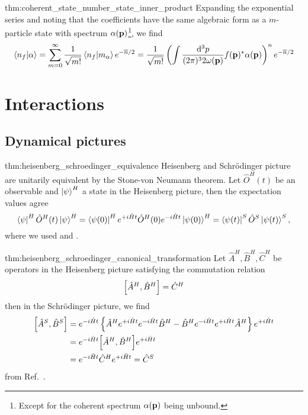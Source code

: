 \begin{delayedproof}{thm:coherent_state_number_state_inner_product}
	Expanding the exponential series and noting that the coefficients have the same algebraic form as a $m$-particle state with spectrum $\alpha(\vb{p})$\footnote{Except for the coherent spectrum $\alpha(\vb{p})$ being unbound.}, we find
	\begin{equation*}
		\braket{n_f}{\alpha}
		=
		\sum_{m=0}^\infty
		\frac{1}{\sqrt{m!}}
		\braket{n_f}{m_\alpha}
		e^{-\overline{n}/2}
		=
		\frac{1}{\sqrt{m!}}
		\left(
			\int\frac{\dd[3]{p}}{(2\pi)^32\omega(\vb{p})}
			f(\vb{p})^*
			\alpha(\vb{p})
		\right)^n
		e^{-\overline{n}/2}
	\end{equation*}
\end{delayedproof}

\section{Interactions}

\subsection{Dynamical pictures}

\begin{delayedproof}{thm:heisenberg_schroedinger_equivalence}
	Heisenberg and Schrödinger picture are unitarily equivalent by the Stone-von Neumann theorem.
	Let $\hat{O}^H(t)$ be an observable and $\ket{\psi}^H$ a state in the Heisenberg picture, then the expectation values agree
	\begin{equation}
		\bra{\psi}^H
		\hat{O}^H(t)
		\ket{\psi}^H
		=
		\bra{\psi(0)}^H
		e^{+i\hat{H}t}
		\hat{O}^H(0)
		e^{-i\hat{H}t}
		\ket{\psi(0)}^H
		=
		\bra{\psi(t)}^S
		\hat{O}^S
		\ket{\psi(t)}^S
		,
	\end{equation}
	where we used  and .
\end{delayedproof}

\begin{delayedproof}{thm:heisenberg_schroedinger_canonical_transformation}
	Let $\hat{A}^H,\hat{B}^H,\hat{C}^H$ be operators in the Heisenberg picture satisfying the commutation relation
	\begin{equation}
		\comm{\hat{A}^H}{\hat{B}^H}
		=
		\hat{C}^H
	\end{equation}
	then in the Schrödinger picture, we find
	\begin{equation}
		\begin{split}
			\comm{\hat{A}^S}{\hat{B}^S}
			&=
			e^{-i\hat{H}t}
			\left\{
				\hat{A}^H
				e^{+i\hat{H}t}
				e^{-i\hat{H}t}
				\hat{B}^H
				-	
				\hat{B}^H
				e^{-i\hat{H}t}
				e^{+i\hat{H}t}
				\hat{A}^H
			\right\}
			e^{+i\hat{H}t}
			\\
			&=
			e^{-i\hat{H}t}
			\comm{\hat{A}^H}{\hat{B}^H}
			e^{+i\hat{H}t}
			\\
			&=
			e^{-i\hat{H}t}
			\hat{C}^H
			e^{+i\hat{H}t}
			=
			\hat{C}^S
		\end{split}
	\end{equation}
	from Ref.~\cite[p.~213]{Greiner2013}.
\end{delayedproof}


